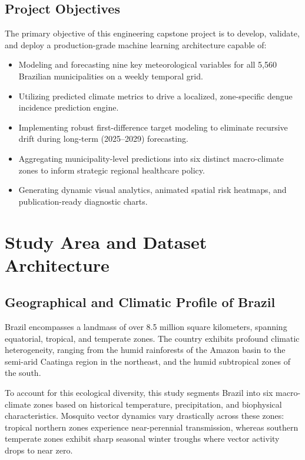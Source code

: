 \documentclass[journal,onecolumn,11pt]{IEEEtran}
\begin{document}
\subsection{Project Objectives}
The primary objective of this engineering capstone project is to develop, validate, and deploy a production-grade machine learning architecture capable of:
\begin{itemize}
    \item Modeling and forecasting nine key meteorological variables for all 5,560 Brazilian municipalities on a weekly temporal grid.
    \item Utilizing predicted climate metrics to drive a localized, zone-specific dengue incidence prediction engine.
    \item Implementing robust first-difference target modeling to eliminate recursive drift during long-term (2025--2029) forecasting.
    \item Aggregating municipality-level predictions into six distinct macro-climate zones to inform strategic regional healthcare policy.
    \item Generating dynamic visual analytics, animated spatial risk heatmaps, and publication-ready diagnostic charts.
\end{itemize}

\section{Study Area and Dataset Architecture}

\subsection{Geographical and Climatic Profile of Brazil}
Brazil encompasses a landmass of over 8.5 million square kilometers, spanning equatorial, tropical, and temperate zones. The country exhibits profound climatic heterogeneity, ranging from the humid rainforests of the Amazon basin to the semi-arid Caatinga region in the northeast, and the humid subtropical zones of the south. 

To account for this ecological diversity, this study segments Brazil into six macro-climate zones based on historical temperature, precipitation, and biophysical characteristics. Mosquito vector dynamics vary drastically across these zones: tropical northern zones experience near-perennial transmission, whereas southern temperate zones exhibit sharp seasonal winter troughs where vector activity drops to near zero.
\end{document}
